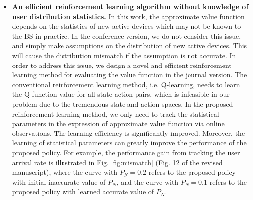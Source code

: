 \documentclass[12pt,onecolumn]{IEEEtran}
\begin{document}
{\begin{itemize}
	\item \textbf{An efficient reinforcement learning algorithm without knowledge of user distribution statistics.} In this work, the approximate value function depends on the statistics of new active devices which may not be known to the BS in practice. In the conference version, we do not consider this issue, and simply make assumptions on the distribution of new active devices. This will cause the distribution mismatch if the assumption is not accurate. In order to address this issue, we design a novel and efficient reinforcement learning method for evaluating the value function in the journal version. The conventional reinforcement learning method, i.e. Q-learning, needs to learn the Q-function value for all state-action pairs, which is infeasible in our problem due to the tremendous state and action spaces. In the proposed reinforcement learning method, we only need to track the statistical parameters in the expression of approximate value function via online observations. The learning efficiency is significantly improved. Moreover, the learning of statistical parameters can greatly improve the performance of the proposed policy. For example, the performance gain from tracking the user arrival rate is illustrated in Fig. \ref{fig:mismatch} (Fig. 12 of the revised manuscript), where the curve with $P_N=0.2$ refers to the proposed policy with initial inaccurate value of $P_N$, and the curve with $P_N=0.1$ refers to the proposed policy with learned accurate value of $P_N$.
	\end{itemize}
}
\end{document}
